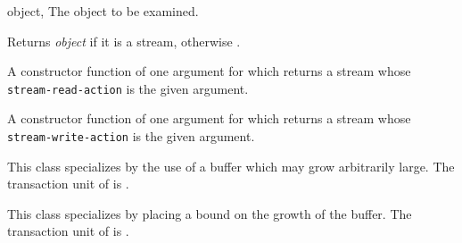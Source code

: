 \begin{optDefinition}
\begin{arguments}
  \item[object, \classref{object}] The object to be examined.
\end{arguments}
%
\result%
Returns {\em object\/} if it is a stream, otherwise \nil.

A constructor function of one argument for  which
returns a stream whose {\tt stream-read-action} is the given argument.

A constructor function of one argument for  which returns a stream
whose {\tt stream-write-action} is the given argument.

%
This class specializes  by the use of a buffer which may grow
arbitrarily large. The transaction unit of  is
.

%
This class specializes  by placing a bound on the
growth of the buffer. The transaction unit of 
is .


\end{optDefinition}
